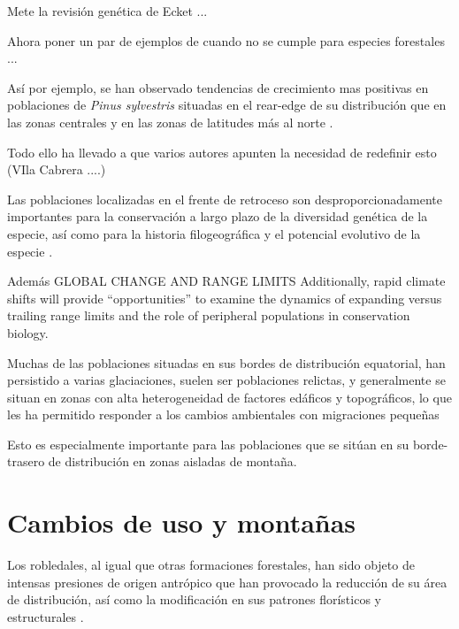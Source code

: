 Mete la revisión genética de Ecket 
...

Ahora poner un par de ejemplos de cuando no se cumple para especies forestales ... 


Así por ejemplo, se han observado tendencias de crecimiento mas positivas en poblaciones de \emph{Pinus sylvestris} situadas en el rear-edge de su distribución que en las zonas centrales y en las zonas de latitudes más al norte \autocite{Matiasetal2017ContrastingGrowth}. 


Todo ello ha llevado a que varios autores apunten la necesidad de redefinir esto (VIla Cabrera ....) 


Las poblaciones localizadas en el frente de retroceso \autocite[\textit{rear-edge, sensu} ][]{HampePetit2005ConservingBiodiversity} son desproporcionadamente importantes para la conservación a largo plazo de la diversidad genética de la especie, así como para la historia filogeográfica y el potencial evolutivo de la especie \autocite[][]{HampePetit2005ConservingBiodiversity}.  

Además 
GLOBAL CHANGE AND RANGE LIMITS
Additionally, rapid climate shifts will provide “opportunities” to examine the dynamics of expanding versus trailing range limits and the role of peripheral populations in conservation biology.




Muchas de las poblaciones situadas en sus bordes de distribución equatorial, han persistido a varias glaciaciones, suelen ser poblaciones relictas, y generalmente se situan en zonas con alta heterogeneidad de factores edáficos y topográficos, lo que les ha permitido responder a los cambios ambientales con migraciones pequeñas 


Esto es especialmente importante para las poblaciones que se sitúan en su borde-trasero de distribución en zonas aisladas de montaña. 

\section{Cambios de uso y montañas}
Los robledales, al igual que otras formaciones forestales, han sido objeto de intensas presiones de origen antrópico que han provocado la reducción de su área de distribución, así como la modificación en sus patrones florísticos y estructurales \autocites{Gavilanetal2000EffectsDisturbance,Gavilanetal2007ModellingCurrent,Tarregaetal2006ForestStructure}. 


